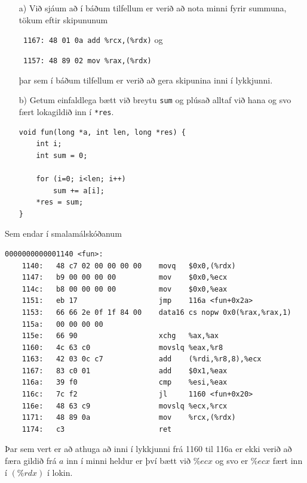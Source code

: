 \documentclass{article}
\begin{document}
	\section{}
	\begin{itemize}
		\item[a)] Við sjáum að í báðum tilfellum er verið að nota minni 
			fyrir summuna, tökum eftir skipununum 

			\texttt{ 1167:	48 01 0a             	add    \%rcx,(\%rdx)} og 

			\texttt{ 1157:	48 89 02             	mov    \%rax,(\%rdx)}

			þar sem í báðum tilfellum er verið að gera skipunina inni í lykkjunni.

		\item[b)] Getum einfaldlega bætt við breytu \texttt{sum} og plúsað 
			alltaf við hana og svo fært lokagildið inn í \texttt{*res}. 

			\begin{verbatim}
void fun(long *a, int len, long *res) {
    int i;
    int sum = 0;
  
    for (i=0; i<len; i++)
        sum += a[i];
    *res = sum;
}
			\end{verbatim}
	\end{itemize}

	Sem endar í smalamálskóðanum 

	\begin{verbatim}
0000000000001140 <fun>:
    1140:	48 c7 02 00 00 00 00 	movq   $0x0,(%rdx)
    1147:	b9 00 00 00 00       	mov    $0x0,%ecx
    114c:	b8 00 00 00 00       	mov    $0x0,%eax
    1151:	eb 17                	jmp    116a <fun+0x2a>
    1153:	66 66 2e 0f 1f 84 00 	data16 cs nopw 0x0(%rax,%rax,1)
    115a:	00 00 00 00 
    115e:	66 90                	xchg   %ax,%ax
    1160:	4c 63 c0             	movslq %eax,%r8
    1163:	42 03 0c c7          	add    (%rdi,%r8,8),%ecx
    1167:	83 c0 01             	add    $0x1,%eax
    116a:	39 f0                	cmp    %esi,%eax
    116c:	7c f2                	jl     1160 <fun+0x20>
    116e:	48 63 c9             	movslq %ecx,%rcx
    1171:	48 89 0a             	mov    %rcx,(%rdx)
    1174:	c3                   	ret
	\end{verbatim}

	Þar sem vert er að athuga að inni í lykkjunni frá 1160 til 116a er ekki 
	verið að færa gildið frá $a$ inn í minni heldur er því bætt við $\%ecx$ 
	og svo er $\%ecx$ fært inn í $(\%rdx)$ í lokin.

	\section{}
\end{document}
